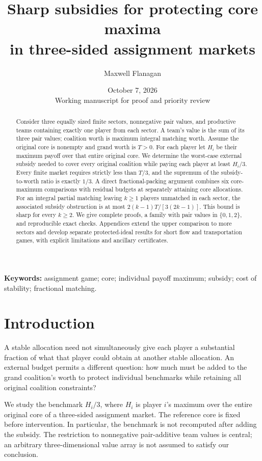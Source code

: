 \documentclass[11pt]{article}
\title{Sharp subsidies for protecting core maxima\\in three-sided assignment markets}
\author{Maxwell Flanagan}
\date{October 7, 2026\\[3pt]\small Working manuscript for proof and priority review}
\theoremstyle{remark}
\begin{document}
\maketitle

\begin{abstract}
Consider three equally sized finite sectors, nonnegative pair values, and
productive teams containing exactly one player from each sector. A team's
value is the sum of its three pair values; coalition worth is maximum integral
matching worth. Assume the original core is nonempty and grand worth is
$T>0$. For each player let $H_i$ be their maximum payoff over that entire
original core. We determine the worst-case external subsidy needed to cover
every original coalition while paying each player at least $H_i/3$.
Every finite market requires strictly less than $T/3$, and the supremum of
the subsidy-to-worth ratio is exactly $1/3$. A direct fractional-packing
argument combines six core-maximum comparisons with residual budgets at
separately attaining core allocations. For an integral partial matching
leaving $k\ge1$ players unmatched in each sector, the associated subsidy
obstruction is at most $2(k-1)T/[3(2k-1)]$. This bound is sharp for every
$k\ge2$. We give complete proofs, a family with pair values in
$\{0,1,2\}$, and reproducible exact checks. Appendices extend the upper comparison to
more sectors and develop separate protected-ideal results for short flow
and transportation games, with explicit limitations and ancillary certificates.
\end{abstract}
\noindent\textbf{Keywords:} assignment game; core; individual payoff maximum;
subsidy; cost of stability; fractional matching.

\section{Introduction}
A stable allocation need not simultaneously give each player a substantial
fraction of what that player could obtain at another stable allocation.
An external budget permits a different question: how much must be added to
the grand coalition's worth to protect individual benchmarks while retaining
all original coalition constraints?

We study the benchmark $H_i/3$, where $H_i$ is player $i$'s maximum over the
entire original core of a three-sided assignment market. The reference core
is fixed before intervention. In particular, the benchmark is not recomputed
after adding the subsidy. The restriction to nonnegative pair-additive team
values is central; an arbitrary three-dimensional value array is not assumed
to satisfy our conclusion.
\end{document}
